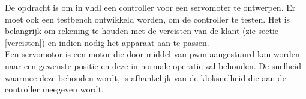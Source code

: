 De opdracht is om in \gls{vhdl} een controller voor een servomoter te ontwerpen. Er moet ook een testbench ontwikkeld worden, om de controller te testen. Het is belangrijk om rekening te houden met de vereisten van de klant (zie sectie \ref{vereisten}) en indien nodig het apparaat aan te passen.\\
Een servomotor is een motor die door middel van \gls{pwm} aangestuurd kan worden naar een gewenste positie en deze in normale operatie zal behouden. De snelheid waarmee deze behouden wordt, is afhankelijk van de kloksnelheid die aan de controller meegeven wordt.